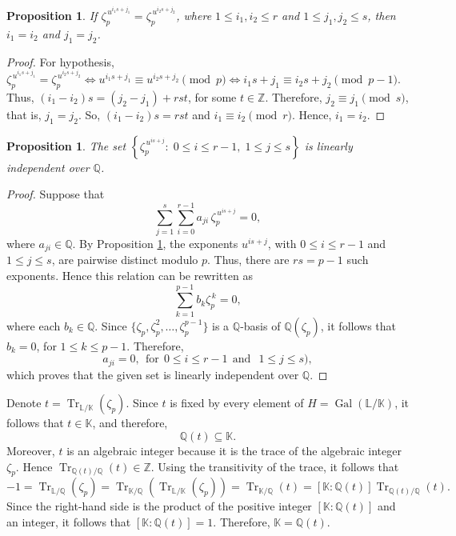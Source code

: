 \documentclass{amsart}
\newtheorem{proposition}[theorem]{Proposition}
\begin{document}
\begin{proposition} \label{lem-1} If $\zeta_p^{\,u^{i_1s+j_1}} = \zeta_p^{\,u^{i_2s+j_2}}$, where $1\le i_1,i_2\le r$ and $1\le j_1,j_2\le s$, then $i_1=i_2$ and $j_1=j_2$. \end{proposition}
\begin{proof} For hypothesis, $\zeta_p^{\,u^{i_1s+j_1}} = \zeta_p^{\,u^{i_2s+j_2}}\iff u^{i_1s+j_1} \equiv u^{i_2s+j_2} \pmod p \iff i_1s+j_1 \equiv i_2s+j_2 \pmod{p-1}$. Thus, $(i_1-i_2)s=(j_2-j_1)+rst$, for some $t\in\mathbb{Z}$. Therefore, $j_2\equiv j_1 \pmod s$, that is, $j_1=j_2$. So, $(i_1-i_2)s=rst$ and $i_1\equiv i_2 \pmod r$. Hence, $i_1=i_2$. \end{proof}

\begin{proposition}\label{prop-1} The set $\left\{ \zeta_p^{\,u^{is+j}}:\; 0\le i\le r-1,\; 1\le j\le s \right\}$  is linearly independent over $\mathbb{Q}$. \end{proposition}
\begin{proof} Suppose that \[ \sum_{j=1}^{s}\sum_{i=0}^{r-1} a_{ji}\,\zeta_p^{\,u^{is+j}} = 0, \] where $a_{ji}\in\mathbb{Q}$.
By Proposition \ref{lem-1}, the exponents $u^{is+j}$, with $0\le i\le r-1$ and $1\le j\le s$, are pairwise distinct modulo $p$. Thus, there are $rs=p-1$
such exponents. Hence this relation can be rewritten as \[ \sum_{k=1}^{p-1} b_k\zeta_p^{\,k} = 0, \] where each $b_k\in\mathbb{Q}$.
Since $\{\zeta_p,\zeta_p^2,\ldots,\zeta_p^{p-1}\}$ is a $\mathbb{Q}$-basis of $\mathbb{Q}(\zeta_p)$, it follows that $b_k=0$, for $1\le k\le p-1$. 
Therefore, \[ a_{ji}=0, \ \ \mbox{for} \ \ 0\le i\le r-1 \ \ \mbox{and} \ \ \;1\le j\le s), \] which proves that the given set is linearly independent over $\mathbb{Q}$. \end{proof}

Denote $
t=\operatorname{Tr}_{\mathbb{L}/\mathbb{K}}(\zeta_p)$. Since $t$ is fixed by every element of $H=\operatorname{Gal}(\mathbb{L}/\mathbb{K})$, it follows that $ t\in\mathbb{K}$, and therefore,
\[ \mathbb{Q}(t)\subseteq\mathbb{K}. \] Moreover, $t$ is an algebraic integer because it is the trace of the algebraic
integer $\zeta_p$. Hence $\operatorname{Tr}_{\mathbb{Q}(t)/\mathbb{Q}}(t)\in\mathbb{Z}$. Using the transitivity of the trace, it follows that
\[  -1 = \operatorname{Tr}_{\mathbb{L}/\mathbb{Q}}(\zeta_p) = \operatorname{Tr}_{\mathbb{K}/\mathbb{Q}} \!\left( \operatorname{Tr}_{\mathbb{L}/\mathbb{K}}(\zeta_p)\right) = \operatorname{Tr}_{\mathbb{K}/\mathbb{Q}}(t) = [\mathbb{K}:\mathbb{Q}(t)] \operatorname{Tr}_{\mathbb{Q}(t)/\mathbb{Q}}(t). \]
Since the right-hand side is the product of the positive integer $[\mathbb{K}:\mathbb{Q}(t)]$ and an integer, it follows that $[\mathbb{K}:\mathbb{Q}(t)]=1$.
Therefore, $\mathbb{K}=\mathbb{Q}(t)$.
\end{document}
